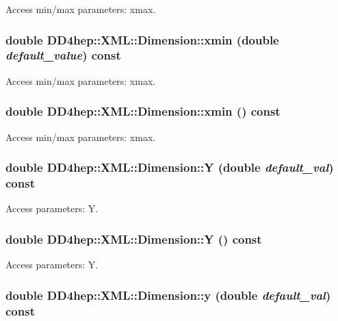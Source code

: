 Access min/max parameters: xmax. \hypertarget{struct_d_d4hep_1_1_x_m_l_1_1_dimension_a7438d71031628c93135a3e3d9c853d64}{
\subsubsection[{xmin}]{\setlength{\rightskip}{0pt plus 5cm}double DD4hep::XML::Dimension::xmin (double {\em default\_\-value}) const}}
\label{struct_d_d4hep_1_1_x_m_l_1_1_dimension_a7438d71031628c93135a3e3d9c853d64}


Access min/max parameters: xmax. \hypertarget{struct_d_d4hep_1_1_x_m_l_1_1_dimension_adc931b18c79a8373dbddff5f7dcc3760}{
\subsubsection[{xmin}]{\setlength{\rightskip}{0pt plus 5cm}double DD4hep::XML::Dimension::xmin () const}}
\label{struct_d_d4hep_1_1_x_m_l_1_1_dimension_adc931b18c79a8373dbddff5f7dcc3760}


Access min/max parameters: xmax. \hypertarget{struct_d_d4hep_1_1_x_m_l_1_1_dimension_ad748751b2959317aaa8fc96eec62839d}{
\subsubsection[{Y}]{\setlength{\rightskip}{0pt plus 5cm}double DD4hep::XML::Dimension::Y (double {\em default\_\-val}) const}}
\label{struct_d_d4hep_1_1_x_m_l_1_1_dimension_ad748751b2959317aaa8fc96eec62839d}


Access parameters: Y. \hypertarget{struct_d_d4hep_1_1_x_m_l_1_1_dimension_a705919dff100963148b1b47765e1f553}{
\subsubsection[{Y}]{\setlength{\rightskip}{0pt plus 5cm}double DD4hep::XML::Dimension::Y () const}}
\label{struct_d_d4hep_1_1_x_m_l_1_1_dimension_a705919dff100963148b1b47765e1f553}


Access parameters: Y. \hypertarget{struct_d_d4hep_1_1_x_m_l_1_1_dimension_a8182d9d03ae35d8cc594f2086e5c3af5}{
\subsubsection[{y}]{\setlength{\rightskip}{0pt plus 5cm}double DD4hep::XML::Dimension::y (double {\em default\_\-val}) const}}
\label{struct_d_d4hep_1_1_x_m_l_1_1_dimension_a8182d9d03ae35d8cc594f2086e5c3af5}


